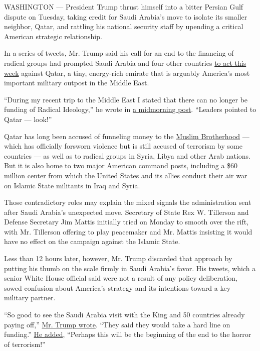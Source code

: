 WASHINGTON --- President Trump thrust himself into a bitter Persian Gulf
dispute on Tuesday, taking credit for Saudi Arabia's move to isolate its
smaller neighbor, Qatar, and rattling his national security staff by
upending a critical American strategic relationship.

In a series of tweets, Mr. Trump said his call for an end to the
financing of radical groups had prompted Saudi Arabia and four other
countries
\href{https://www.nytimes.com/2017/06/05/world/middleeast/qatar-saudi-arabia-egypt-bahrain-united-arab-emirates.html}{to
act this week} against Qatar, a tiny, energy-rich emirate that is
arguably America's most important military outpost in the Middle East.

``During my recent trip to the Middle East I stated that there can no
longer be funding of Radical Ideology,'' he wrote in
\href{https://twitter.com/realDonaldTrump/status/872062159789985792}{a
midmorning post}. ``Leaders pointed to Qatar --- look!''

Qatar has long been accused of funneling money to the
\href{https://www.nytimes.com/2017/02/07/world/middleeast/muslim-brotherhood-terrorism-trump.html}{Muslim
Brotherhood} --- which has officially forsworn violence but is still
accused of terrorism by some countries --- as well as to radical groups
in Syria, Libya and other Arab nations. But it is also home to two major
American command posts, including a \$60 million center from which the
United States and its allies conduct their air war on Islamic State
militants in Iraq and Syria.

Those contradictory roles may explain the mixed signals the
administration sent after Saudi Arabia's unexpected move. Secretary of
State Rex W. Tillerson and Defense Secretary Jim Mattis initially tried
on Monday to smooth over the rift, with Mr. Tillerson offering to play
peacemaker and Mr. Mattis insisting it would have no effect on the
campaign against the Islamic State.

Less than 12 hours later, however, Mr. Trump discarded that approach by
putting his thumb on the scale firmly in Saudi Arabia's favor. His
tweets, which a senior White House official said were not a result of
any policy deliberation, sowed confusion about America's strategy and
its intentions toward a key military partner.

``So good to see the Saudi Arabia visit with the King and 50 countries
already paying off,''
\href{https://twitter.com/realDonaldTrump/status/872084870620520448}{Mr.
Trump wrote}. ``They said they would take a hard line on funding.''
\href{https://twitter.com/realDonaldTrump/status/872086906804240384}{He
added}, ``Perhaps this will be the beginning of the end to the horror of
terrorism!''

